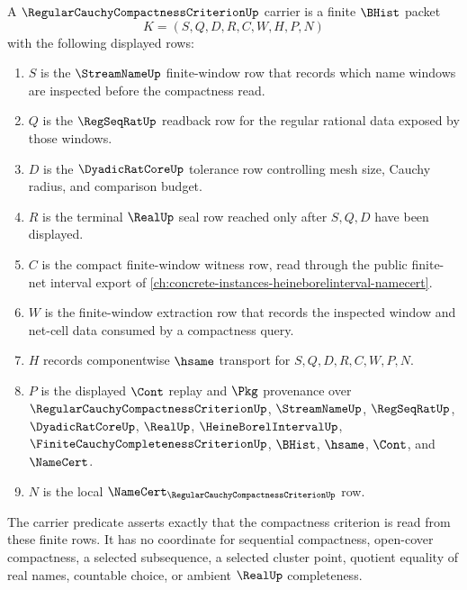 \begin{definition}
\label{def:regular-cauchy-compactness-criterion-carrier}
A $\RegularCauchyCompactnessCriterionUp$ carrier is a finite $\BHist$ packet
$$
K=(S,Q,D,R,C,W,H,P,N)
$$
with the following displayed rows:
\begin{enumerate}
\item $S$ is the $\StreamNameUp$ finite-window row that records which name windows are inspected before the compactness read.
\item $Q$ is the $\RegSeqRatUp$ readback row for the regular rational data exposed by those windows.
\item $D$ is the $\DyadicRatCoreUp$ tolerance row controlling mesh size, Cauchy radius, and comparison budget.
\item $R$ is the terminal $\RealUp$ seal row reached only after $S,Q,D$ have been displayed.
\item $C$ is the compact finite-window witness row, read through the public finite-net interval export of \autoref{ch:concrete-instances-heineborelinterval-namecert}.
\item $W$ is the finite-window extraction row that records the inspected window and net-cell data consumed by a compactness query.
\item $H$ records componentwise $\hsame$ transport for $S,Q,D,R,C,W,P,N$.
\item $P$ is the displayed $\Cont$ replay and $\Pkg$ provenance over $\RegularCauchyCompactnessCriterionUp$, $\StreamNameUp$, $\RegSeqRatUp$, $\DyadicRatCoreUp$, $\RealUp$, $\HeineBorelIntervalUp$, $\FiniteCauchyCompletenessCriterionUp$, $\BHist$, $\hsame$, $\Cont$, and $\NameCert$.
\item $N$ is the local $\NameCert_{\RegularCauchyCompactnessCriterionUp}$ row.
\end{enumerate}
The carrier predicate asserts exactly that the compactness criterion is read from these finite rows. It has no coordinate for sequential compactness, open-cover compactness, a selected subsequence, a selected cluster point, quotient equality of real names, countable choice, or ambient $\RealUp$ completeness.
\end{definition}

